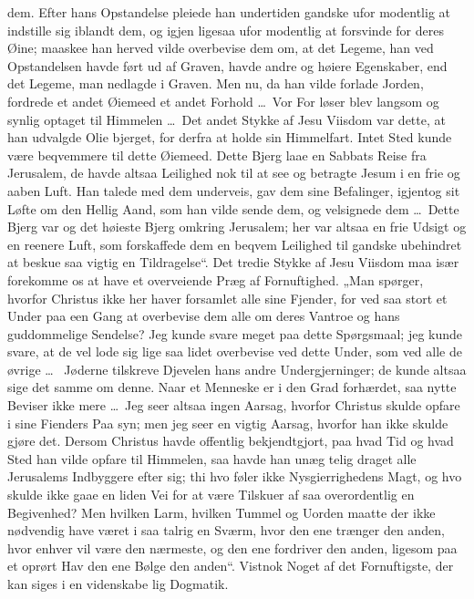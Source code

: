 \documentclass[12pt,a4paper]{article}
\newcommand{\opage}[1]{\marginnote{\footnotesize\textit{[#1]}}}
\begin{document}
dem. Efter hans Opstandelse pleiede han undertiden gandske ufor\-%
modentlig at indstille sig iblandt dem, og igjen ligesaa ufor\-%
modentlig at forsvinde for deres Øine; maaskee han herved vilde
overbevise dem om, at det Legeme, han ved Opstandelsen havde
ført ud af Graven, havde andre og høiere Egenskaber, end det
Legeme, man nedlagde i Graven. Men nu, da han vilde forlade
Jorden, fordrede et andet Øiemeed et andet Forhold \ldots\ Vor For\-%
løser blev langsom og synlig optaget til Himmelen \ldots\ Det
\opage{29}andet Stykke af Jesu Viisdom var dette, at han udvalgde Olie\-%
bjerget, for derfra at holde sin Himmelfart. Intet Sted kunde
være beqvemmere til dette Øiemeed. Dette Bjerg laae en Sabbats
Reise fra Jerusalem, de havde altsaa Leilighed nok til at see og
betragte Jesum i en frie og aaben Luft. Han talede med dem underveis,
gav dem sine Befalinger, igjentog sit Løfte om den Hellig Aand,
som han vilde sende dem, og velsignede dem \ldots\ Dette Bjerg
var og det høieste Bjerg omkring Jerusalem; her var altsaa en
frie Udsigt og en reenere Luft, som forskaffede dem en beqvem
Leilighed til gandske ubehindret at beskue saa vigtig en Tildragelse“.
Det tredie Stykke af Jesu Viisdom maa især forekomme os at have
et overveiende Præg af Fornuftighed. „Man spørger, hvorfor
Christus ikke her haver forsamlet alle sine Fjender, for ved saa
stort et Under paa een Gang at overbevise dem alle om deres
Vantroe og hans guddommelige Sendelse? Jeg kunde svare meget
paa dette Spørgsmaal; jeg kunde svare, at de vel lode sig lige\-%
saa lidet overbevise ved dette Under, som ved alle de øvrige \ldots\ %
Jøderne tilskreve Djevelen hans andre Undergjerninger; de kunde
altsaa sige det samme om denne. Naar et Menneske er i den
Grad forhærdet, saa nytte Beviser ikke mere \ldots\ Jeg seer altsaa
ingen Aarsag, hvorfor Christus skulde opfare i sine Fienders Paa\-%
syn; men jeg seer en vigtig Aarsag, hvorfor han ikke skulde gjøre
det. Dersom Christus havde offentlig bekjendtgjort, paa hvad Tid
og hvad Sted han vilde opfare til Himmelen, saa havde han unæg\-%
telig draget alle Jerusalems Indbyggere efter sig; thi hvo føler
ikke Nysgierrighedens Magt, og hvo skulde ikke gaae en liden
Vei for at være Tilskuer af saa overordentlig en Begivenhed?
Men hvilken Larm, hvilken Tummel og Uorden maatte der ikke
nødvendig have været i saa talrig en Sværm, hvor den ene trænger
den anden, hvor enhver vil være den nærmeste, og den ene fordriver
den anden, ligesom paa et oprørt Hav den ene Bølge den anden“.
Vistnok Noget af det Fornuftigste, der kan siges i en videnskabe\-%
lig Dogmatik.
\end{document}
